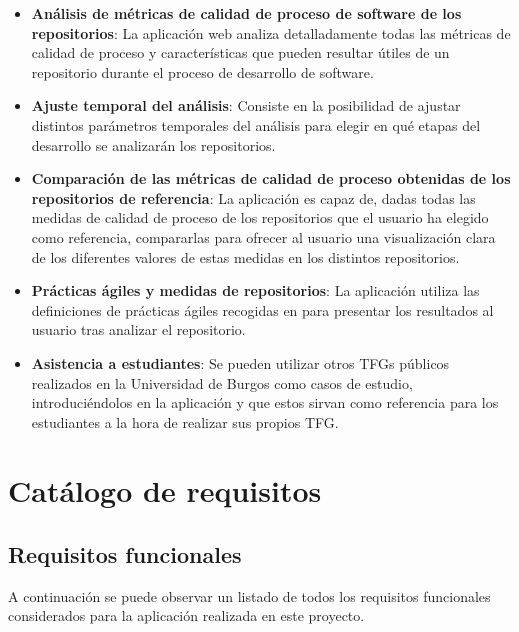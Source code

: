 \begin{itemize}

\item \textbf{Análisis de métricas de calidad de proceso de software de los repositorios}: La aplicación web analiza detalladamente todas las métricas de calidad de proceso y características que pueden resultar útiles de un repositorio durante el proceso de desarrollo de software.

\item \textbf{Ajuste temporal del análisis}: Consiste en la posibilidad de ajustar distintos parámetros temporales del análisis para elegir en qué etapas del desarrollo se analizarán los repositorios.

\item \textbf{Comparación de las métricas de calidad de proceso obtenidas de los repositorios de referencia}: La aplicación es capaz de, dadas todas las medidas de calidad de proceso de los repositorios que el usuario ha elegido como referencia, compararlas para ofrecer al usuario una visualización clara de los diferentes valores de estas medidas en los distintos repositorios.

\item \textbf{Prácticas ágiles y medidas de repositorios}: La aplicación utiliza las definiciones de prácticas ágiles recogidas en \cite{agileSubwayMap} para presentar los resultados al usuario tras analizar el repositorio.

\item \textbf{Asistencia a estudiantes}: Se pueden utilizar otros TFGs públicos realizados en la Universidad de Burgos como casos de estudio, introduciéndolos en la aplicación y que estos sirvan como referencia para los estudiantes a la hora de realizar sus propios TFG.

\end{itemize}

\section{Catálogo de requisitos}

\subsection{Requisitos funcionales}
A continuación se puede observar un listado de todos los requisitos funcionales considerados para la aplicación realizada en este proyecto.

